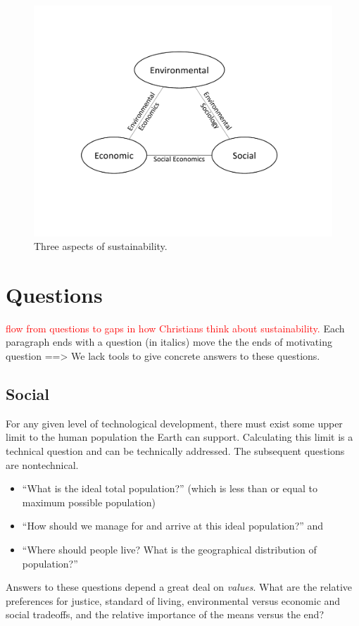 \documentclass[12pt]{article}
\newcommand{\ins}[1]{\textcolor{red}{#1}}
\begin{document}
\begin{figure}
\centering
\includegraphics[width=1\linewidth]{figure_other/TriangleDiagram.pdf}
\caption{Three aspects of sustainability.}
\label{fig:3_sustain}
\end{figure}


\section{Questions}
\label{sec:questions}

\ins{flow from questions to gaps in how Christians think about sustainability.}
Each paragraph ends with a question (in italics) 
move the the ends of motivating question ==> We lack tools to give concrete answers to these questions.

\subsection{Social}
For any given level of technological development, there must exist some upper limit to the human population the Earth
can support. Calculating this limit is a technical question and can be technically addressed. The subsequent questions are nontechnical.
\begin{itemize}
\item ``What is the ideal total population?'' (which is less than or equal to maximum possible population) %
\item ``How should we manage for and arrive at this ideal population?'' and %
\item ``Where should people live? What is the geographical distribution of population?'' %
\end{itemize}
Answers to these questions depend a great deal on \emph{values}. What are the relative preferences for justice, standard of living, 
environmental versus economic and social tradeoffs, and the relative importance of the means versus the end?
\end{document}
